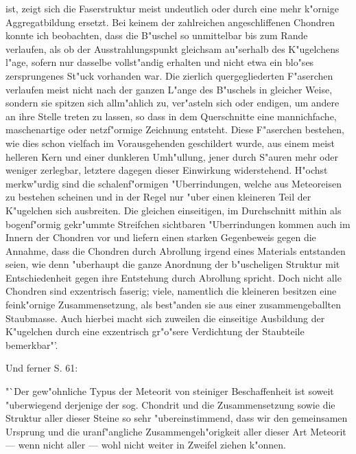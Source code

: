 \documentclass[a4paper, 11pt, oneside]{article}
\begin{document}
ist, zeigt sich die Faserstruktur meist undeutlich oder durch eine mehr k"ornige Aggregatbildung ersetzt. Bei keinem der zahlreichen angeschliffenen Chondren konnte ich beobachten, dass die B"uschel so unmittelbar bis zum Rande verlaufen, als ob der Ausstrahlungspunkt gleichsam au"serhalb des K"ugelchens l"age, sofern nur dasselbe vollst"andig erhalten und nicht etwa ein blo"ses zersprungenes St"uck vorhanden war. Die zierlich quergegliederten F"aserchen verlaufen meist nicht nach der ganzen L"ange des B"uschels in gleicher Weise, sondern sie spitzen sich allm"ahlich zu, ver"asteln sich oder endigen, um andere an ihre Stelle treten zu lassen, so dass in dem Querschnitte eine mannichfache, maschenartige oder netzf"ormige Zeichnung entsteht. Diese F"aserchen bestehen, wie dies schon vielfach im Vorausgehenden geschildert wurde, aus einem meist helleren Kern und einer dunkleren Umh"ullung, jener durch S"auren mehr oder weniger zerlegbar, letztere dagegen dieser Einwirkung widerstehend. H"ochst merkw"urdig sind die schalenf"ormigen "Uberrindungen, welche aus Meteoreisen zu bestehen scheinen und in der Regel nur "uber einen kleineren Teil der K"ugelchen sich ausbreiten. Die gleichen einseitigen, im Durchschnitt mithin als bogenf"ormig gekr"ummte Streifchen sichtbaren "Uberrindungen kommen auch im Innern der Chondren vor und liefern einen starken Gegenbeweis gegen die Annahme, dass die Chondren durch Abrollung irgend eines Materials entstanden seien, wie denn "uberhaupt die ganze Anordnung der b"uscheligen Struktur mit Entschiedenheit gegen ihre Entstehung durch Abrollung spricht. Doch nicht alle Chondren sind exzentrisch faserig; viele, namentlich die kleineren besitzen eine feink"ornige Zusammensetzung, als best"anden sie aus einer zusammengeballten Staubmasse. Auch hierbei macht sich zuweilen die einseitige Ausbildung der K"ugelchen durch eine exzentrisch gr"o"sere Verdichtung der Staubteile bemerkbar"'.

Und ferner S. 61:

"`Der gew"ohnliche Typus der Meteorit von steiniger Beschaffenheit ist soweit "uberwiegend derjenige der sog. Chondrit und die Zusammensetzung sowie die Struktur aller dieser Steine so sehr "ubereinstimmend, dass wir den gemeinsamen Ursprung und die uranf"angliche Zusammengeh"origkeit aller dieser Art Meteorit --- wenn nicht aller --- wohl nicht weiter in Zweifel ziehen k"onnen.
\end{document}
